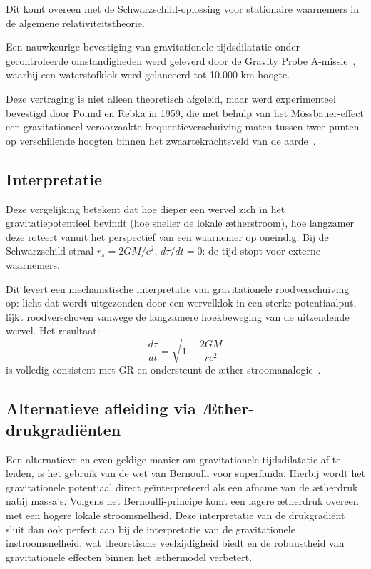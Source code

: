 Dit komt overeen met de Schwarzschild-oplossing voor stationaire waarnemers in de algemene relativiteitstheorie.

Een nauwkeurige bevestiging van gravitationele tijdsdilatatie onder gecontroleerde omstandigheden werd geleverd door de Gravity Probe A-missie~\cite{vessot_levine_1980}, waarbij een waterstofklok werd gelanceerd tot 10.000 km hoogte.

Deze vertraging is niet alleen theoretisch afgeleid, maar werd experimenteel bevestigd door Pound en Rebka in 1959, die met behulp van het M\"ossbauer-effect een gravitationeel veroorzaakte frequentieverschuiving maten tussen twee punten op verschillende hoogten binnen het zwaartekrachtsveld van de aarde~\cite{pound_rebka_1959}.


\subsection*{Interpretatie}

Deze vergelijking betekent dat hoe dieper een wervel zich in het gravitatiepotentieel bevindt (hoe sneller de lokale ætherstroom), hoe langzamer deze roteert vanuit het perspectief van een waarnemer op oneindig. Bij de Schwarzschild-straal $r_s = 2GM/c^2$, $d\tau/dt = 0$: de tijd stopt voor externe waarnemers.

Dit levert een mechanistische interpretatie van gravitationele roodverschuiving op: licht dat wordt uitgezonden door een wervelklok in een sterke potentiaalput, lijkt roodverschoven vanwege de langzamere hoekbeweging van de uitzendende wervel. Het resultaat:
\[
    \boxed{\frac{d\tau}{dt} = \sqrt{1 - \frac{2GM}{rc^2}}}
\]
is volledig consistent met GR en ondersteunt de æther-stroomanalogie~\cite{Schiller2022-maxforce}.

\subsection*{Alternatieve afleiding via Æther-drukgradiënten}

Een alternatieve en even geldige manier om gravitationele tijdsdilatatie af te leiden, is het gebruik van de wet van Bernoulli voor superfluïda. Hierbij wordt het gravitationele potentiaal direct geïnterpreteerd als een afname van de ætherdruk nabij massa's. Volgens het Bernoulli-principe komt een lagere ætherdruk overeen met een hogere lokale stroomsnelheid. Deze interpretatie van de drukgradiënt sluit dan ook perfect aan bij de interpretatie van de gravitationele instroomsnelheid, wat theoretische veelzijdigheid biedt en de robuustheid van gravitationele effecten binnen het æthermodel verbetert.
